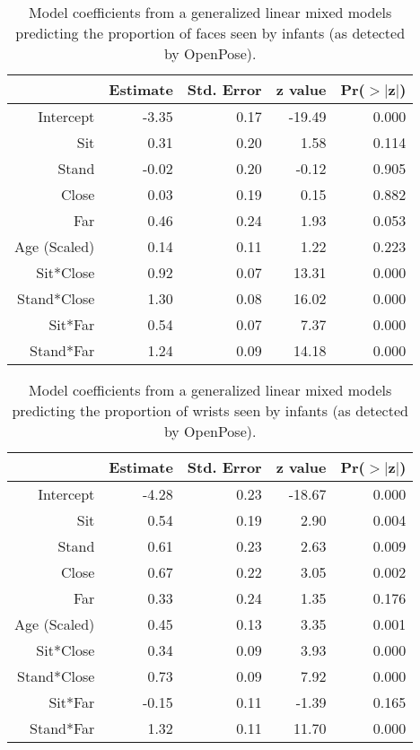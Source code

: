 \documentclass[english,man]{apa6}
\begin{document}
\begin{table}[ht]
\centering
\begin{tabular}{rrrrr}
  \hline
 & Estimate & Std. Error & z value & Pr($>$$|$z$|$) \\
  \hline
Intercept & -3.35 & 0.17 & -19.49 & 0.000 \\
  Sit & 0.31 & 0.20 & 1.58 & 0.114 \\
  Stand & -0.02 & 0.20 & -0.12 & 0.905 \\
  Close & 0.03 & 0.19 & 0.15 & 0.882 \\
  Far & 0.46 & 0.24 & 1.93 & 0.053 \\
  Age (Scaled) & 0.14 & 0.11 & 1.22 & 0.223 \\
  Sit*Close & 0.92 & 0.07 & 13.31 & 0.000 \\
  Stand*Close & 1.30 & 0.08 & 16.02 & 0.000 \\
  Sit*Far & 0.54 & 0.07 & 7.37 & 0.000 \\
  Stand*Far & 1.24 & 0.09 & 14.18 & 0.000 \\
   \hline
\end{tabular}
\caption{Model coefficients from a generalized linear mixed models predicting the proportion of faces seen by infants (as detected by OpenPose).}
\end{table}

\begin{table}[ht]
\centering
\begin{tabular}{rrrrr}
  \hline
 & Estimate & Std. Error & z value & Pr($>$$|$z$|$) \\
  \hline
Intercept & -4.28 & 0.23 & -18.67 & 0.000 \\
  Sit & 0.54 & 0.19 & 2.90 & 0.004 \\
  Stand & 0.61 & 0.23 & 2.63 & 0.009 \\
  Close & 0.67 & 0.22 & 3.05 & 0.002 \\
  Far & 0.33 & 0.24 & 1.35 & 0.176 \\
  Age (Scaled) & 0.45 & 0.13 & 3.35 & 0.001 \\
  Sit*Close & 0.34 & 0.09 & 3.93 & 0.000 \\
  Stand*Close & 0.73 & 0.09 & 7.92 & 0.000 \\
  Sit*Far & -0.15 & 0.11 & -1.39 & 0.165 \\
  Stand*Far & 1.32 & 0.11 & 11.70 & 0.000 \\
   \hline
\end{tabular}
\caption{Model coefficients from a generalized linear mixed models predicting the proportion of wrists seen by infants (as detected by OpenPose).}
\end{table}
\end{document}
